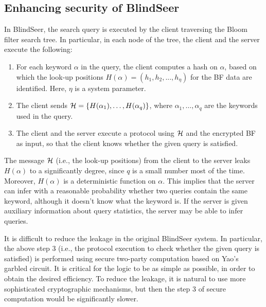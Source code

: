 
\def\HHH{{\cal H}}
\subsection{Enhancing security of BlindSeer}

In BlindSeer, the search query is executed by the client traversing the Bloom filter
search tree. In particular, in each node of the tree, the client and the server
execute the following:
\begin{enumerate}\setlength\itemsep{0em}
\item For each keyword $\alpha$ in the query, the client computes a hash on
$\alpha$, based on which the look-up positions $H(\alpha) =  (h_1, h_2, ...,
h_\eta)$ for the BF data are identified. Here, $\eta$ is a system
parameter. 

\item The client sends $\HHH = \{H(\alpha_1), \ldots, H(\alpha_q)\}$,
  where $\alpha_1,\ldots,\alpha_q$ are the keywords used in the query.

\item The client and the server execute a protocol using $\HHH$ and the
encrypted BF as input, so that the client knows whether the given query is
satisfied. 
\end{enumerate}

The message $\HHH$ (i.e., the look-up positions) from the client to the server
leaks $H(\alpha)$ to a significantly degree, since $q$ is a small number most
of the time. Moreover, $H(\alpha)$ is a deterministic function on $\alpha$.
This implies that the server can infer with a reasonable probability whether
two queries contain the same keyword, although it doesn't know what the keyword
is.  If the server is given  auxiliary information about query statistics, the
server may be able to infer queries. 


It is difficult to reduce the leakage in the original
BlindSeer system. In particular, the above step 3 (i.e., the protocol execution
to check whether the given query is satisfied) is performed using secure
two-party computation based on Yao's garbled circuit. It is critical
for the logic to be as simple as possible, in order to obtain the desired
efficiency. To reduce the leakage, it is natural to use more sophisticated
cryptographic mechanisms, but then the step 3 of secure computation would be
significantly slower. 

